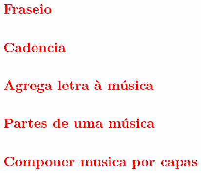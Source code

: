 \section{\textcolor{red}{Fraseio}}


\section{\textcolor{red}{Cadencia}}


\section{\textcolor{red}{Agrega letra à música}}


\section{\textcolor{red}{Partes de uma música}}

\section{\textcolor{red}{Componer musica por capas}}


